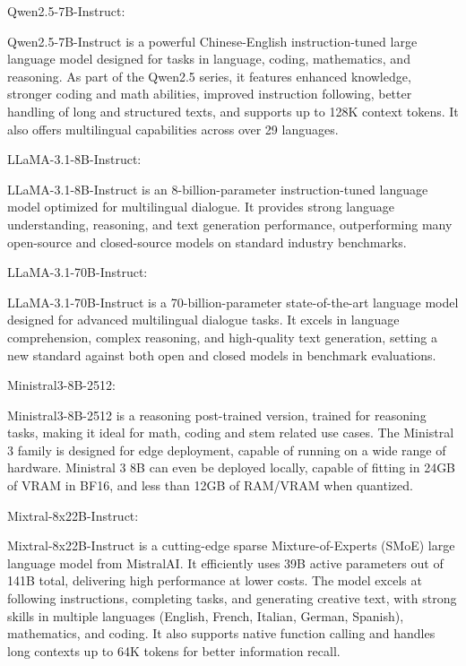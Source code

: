 \begin{tcolorbox}[
    mygreenbox,
    enhanced jigsaw,
    width=\textwidth,
    title={Descriptions of LLM Candidates},
    fonttitle=\Large\bfseries,
    before upper={
        \setlength{\parindent}{0pt}
        \setlength{\parskip}{0pt}
    }
]

Qwen2.5-7B-Instruct:\par\noindent
Qwen2.5-7B-Instruct is a powerful Chinese-English instruction-tuned large language model designed for tasks in language, coding, mathematics, and reasoning. As part of the Qwen2.5 series, it features enhanced knowledge, stronger coding and math abilities, improved instruction following, better handling of long and structured texts, and supports up to 128K context tokens. It also offers multilingual capabilities across over 29 languages.\par\noindent

\medskip
LLaMA-3.1-8B-Instruct:\par\noindent
LLaMA-3.1-8B-Instruct is an 8-billion-parameter instruction-tuned language model optimized for multilingual dialogue. It provides strong language understanding, reasoning, and text generation performance, outperforming many open-source and closed-source models on standard industry benchmarks.\par\noindent

\medskip
LLaMA-3.1-70B-Instruct:\par\noindent
LLaMA-3.1-70B-Instruct is a 70-billion-parameter state-of-the-art language model designed for advanced multilingual dialogue tasks. It excels in language comprehension, complex reasoning, and high-quality text generation, setting a new standard against both open and closed models in benchmark evaluations.\par\noindent

\medskip
Ministral3-8B-2512:\par\noindent
Ministral3-8B-2512 is a reasoning post-trained version, trained for reasoning tasks, making it ideal for math, coding and stem related use cases. The Ministral 3 family is designed for edge deployment, capable of running on a wide range of hardware. Ministral 3 8B can even be deployed locally, capable of fitting in 24GB of VRAM in BF16, and less than 12GB of RAM/VRAM when quantized.\par\noindent

\medskip
Mixtral-8x22B-Instruct:\par\noindent
Mixtral-8x22B-Instruct is a cutting-edge sparse Mixture-of-Experts (SMoE) large language model from MistralAI. It efficiently uses 39B active parameters out of 141B total, delivering high performance at lower costs. The model excels at following instructions, completing tasks, and generating creative text, with strong skills in multiple languages (English, French, Italian, German, Spanish), mathematics, and coding. It also supports native function calling and handles long contexts up to 64K tokens for better information recall.

\end{tcolorbox}
